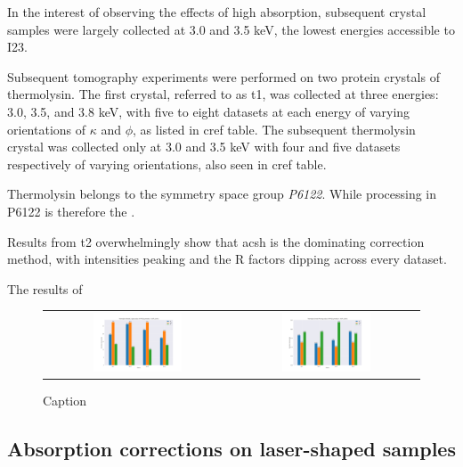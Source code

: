 In the interest of observing the effects of high absorption, subsequent crystal samples were largely collected at 3.0 and 3.5 keV, the lowest energies accessible to I23.

Subsequent tomography experiments were performed on two protein crystals of thermolysin. The first crystal, referred to as \ac{t1}, was collected at three energies: 3.0, 3.5, and 3.8 keV, with five to eight datasets at each energy of varying orientations of $\kappa$ and $\phi$, as listed in cref table. The subsequent thermolysin crystal was collected only at 3.0 and 3.5 keV with four and five datasets respectively of varying orientations, also seen in cref table.

Thermolysin belongs to the symmetry space group \textit{P6122}. While processing in P6122 is therefore the .

Results from \ac{t2} overwhelmingly show that \ac{acsh} is the dominating correction method, with intensities peaking and the R factors dipping across every dataset.

The results of 

\begin{figure}[h]
    \centering
    \begin{tabular}{cc}
    \includegraphics[width = 0.5\textwidth]{plots/Experiment 1/tlys_2 P6122/3p0_I_over_sigma.png} & \includegraphics[width = 0.5\textwidth]{plots/Experiment 1/tlys_2 P6122/3p0_rmerges.png}
    \end{tabular}
    \caption{Caption}
    \label{fig:tlys_2_p6}
\end{figure}

\subsection{Absorption corrections on laser-shaped samples}

